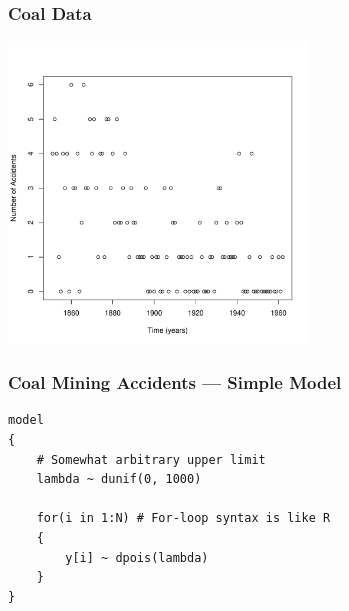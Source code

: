 \documentclass{beamer}
\begin{document}
\begin{frame}[fragile]
\frametitle{Coal Data}

\centering
\includegraphics[width=0.6\textwidth]{images/coal.pdf}

\end{frame}



\begin{frame}[fragile]
\frametitle{Coal Mining Accidents --- Simple Model}

\begin{verbatim}
model
{
    # Somewhat arbitrary upper limit
    lambda ~ dunif(0, 1000)

    for(i in 1:N) # For-loop syntax is like R
    {
        y[i] ~ dpois(lambda)
    }
}
\end{verbatim}

\end{frame}
\end{document}
